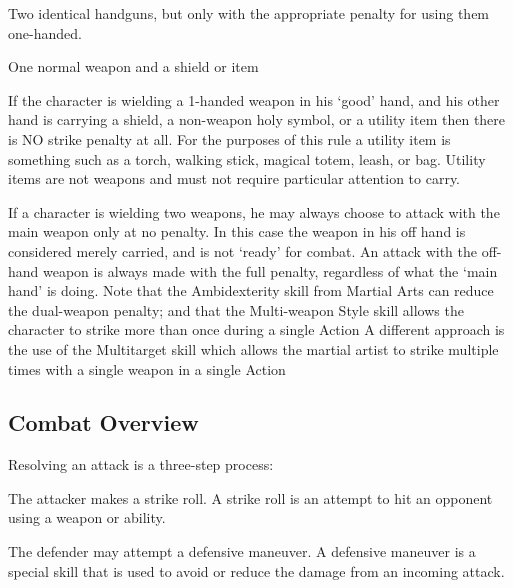 \documentclass[twoside]{book}
\begin{document}
                       Two identical handguns, but only with the
                       appropriate penalty for using them one-handed.
                       
                      
                    
                  
                
                
                   One normal weapon and a shield or item
                   
                    If the character is wielding a 1-handed weapon
                   in his `good' hand, and his other hand is
                   carrying a shield, a non-weapon holy symbol, or a
                   utility item then there is NO strike penalty at all.
                   For the purposes of this rule a utility item is
                   something such as a torch, walking stick, magical
                   totem, leash, or bag. Utility items are not weapons
                   and must not require particular attention to carry.
                   
                
             If a character is wielding two weapons, he may
               always choose to attack with the main weapon only at no
               penalty. In this case the weapon in his off hand is
               considered merely carried, and is not `ready'
               for combat. An attack with the off-hand weapon is always
               made with the full penalty, regardless of what the
               `main hand' is doing.  Note that the Ambidexterity skill from Martial Arts
               can reduce the dual-weapon penalty; and that the
               Multi-weapon Style skill allows the character to strike
               more than once during a single Action A different approach
               is the use of the Multitarget skill which allows the
               martial artist to strike multiple times with a single
               weapon in a single Action 
\subsection{Combat Overview}
     Resolving an attack is a three-step process:   
                
                   The attacker makes a strike roll. A strike roll
                   is an attempt to hit an opponent using a weapon or
                   ability. 
                
                
                   The defender may attempt a defensive maneuver. A
                   defensive maneuver is a special skill that is used to
                   avoid or reduce the damage from an incoming attack.
                   
\end{document}
